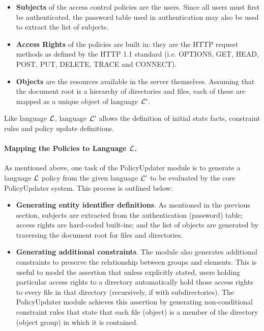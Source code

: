 \documentclass[11pt]{llncs}
\begin{document}
        \begin{itemize}
          \item
            {\bf Subjects} of the access control policies are the users. Since
            all users must first be authenticated, the password table used
            in authentication may also be used to extract the list of subjects.
          \vspace{1mm}
          \item
            {\bf Access Rights} of the policies are built in: they are the
            HTTP request methods as defined by the HTTP 1.1 standard
            \cite{HTTP1} (i.e. OPTIONS, GET, HEAD, POST, PUT, DELETE, TRACE
            and CONNECT).
          \vspace{1mm}
          \item
            {\bf Objects} are the resources available in the server themselves.
            Assuming that the document root is a hierarchy of directories and
            files, each of these are mapped as a unique object of language
            ${\cal L'}$.
        \end{itemize}

        Like language ${\cal L}$, language ${\cal L'}$ allows the definition of
        initial state facts, constraint rules and policy update definitions.

      \paragraph{\bf Mapping the Policies to Language ${\cal L}$.}

        As mentioned above, one task of the PolicyUpdater module is to generate
        a language ${\cal L}$ policy from the given language ${\cal L'}$ to be
        evaluated by the core PolicyUpdater system. This process is outlined
        below:

        \begin{itemize}
          \item
            {\bf Generating entity identifier definitions}. As mentioned in the
            previous section, subjects are extracted from the authentication
            (password) table; access rights are hard-coded built-ins; and
            the list of objects are generated by traversing the document root
            for files and directories.
          \vspace{1mm}
          \item
            {\bf Generating additional constraints}. The module also generates
            additional constraints to preserve the relationship between groups
            and elements. This is useful to model the assertion that unless
            explicitly stated, users holding particular access rights to a
            directory automatically hold those access rights to every file in
            that directory (recursively, if with subdirectories). The
            PolicyUpdater module achieves this assertion by generating
            non-conditional constraint rules that state that each file
            (object) is a member of the directory (object group) in which it
            is contained.
        \end{itemize}
\end{document}
